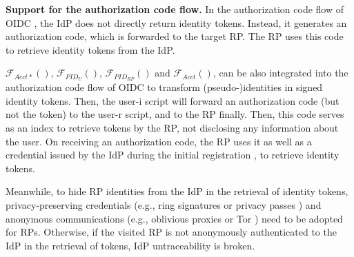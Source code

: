 


\noindent \textbf{Support for the authorization code flow.} In the authorization code flow of OIDC \cite{OpenIDConnect}, the IdP does not directly return identity tokens.
Instead, it generates an authorization code, which is forwarded to the target RP.
The RP uses this code to retrieve identity tokens from the IdP.

$\mathcal{F}_{Acct\ast}()$, $\mathcal{F}_{PID_{U}}()$, $\mathcal{F}_{PID_{RP}}()$ and $\mathcal{F}_{Acct}()$, can be also integrated into the authorization code flow of OIDC to transform (pseudo-)identities in signed identity tokens.
Then, the user-i script will forward an authorization code (but not the token) to the user-r script, and to the RP finally.
Then, this code serves as an index to retrieve tokens by the RP, not disclosing any information about the user.
On receiving an authorization code, the RP uses it as well as a credential issued by the IdP during the initial registration \cite{OpenIDConnect}, to retrieve identity tokens.

Meanwhile, to hide RP identities from the IdP in the retrieval of identity tokens, privacy-preserving credentials
    (e.g., ring signatures \cite{ring-sig} or privacy passes \cite{privacypass,trusttoken})
 and anonymous communications (e.g., oblivious proxies \cite{ohttp-rfc} or Tor \cite{tor}) need to be adopted for RPs.
Otherwise, if the visited RP is not anonymously authenticated to the IdP in the retrieval of tokens,
    IdP untraceability is broken.

